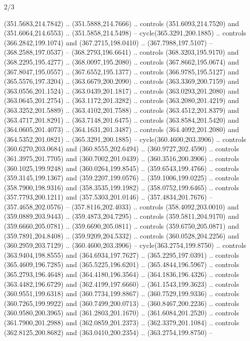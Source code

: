 \begin{flagdescription}{2/3}
\begin{scope}[xshift=0.5\flaglength,yshift=0.5\flagwidth,scale=\flagwidth/495.65]
\begin{scope}[y=0.8pt, x=0.8pt, yscale=-1,shift={(-463.76,-309.78)}]
  (351.5683,214.7842) .. (351.5888,214.7666) .. controls (351.6093,214.7520) and
  (351.6064,214.6553) .. (351.5858,214.5498) -- cycle(365.3291,200.1885) ..
  controls (366.2842,199.1074) and (367.2715,198.0410) .. (367.7988,197.5107) --
  (368.2588,197.0537) -- (368.2793,196.6641) .. controls (368.3203,195.9170) and
  (368.2295,195.4277) .. (368.0097,195.2080) .. controls (367.8662,195.0674) and
  (367.8047,195.0557) .. (367.6552,195.1377) .. controls (366.9785,195.5127) and
  (365.5576,197.3204) .. (363.6679,200.2090) .. controls (363.3369,200.7159) and
  (363.0556,201.1524) .. (363.0439,201.1817) .. controls (363.0293,201.2080) and
  (363.0645,201.2754) .. (363.1172,201.3282) .. controls (363.2080,201.4219) and
  (363.3252,201.5889) .. (363.4102,201.7588) .. controls (363.4512,201.8379) and
  (363.4717,201.8291) .. (363.7148,201.6475) .. controls (363.8584,201.5420) and
  (364.0605,201.4073) .. (364.1631,201.3487) .. controls (364.4092,201.2080) and
  (364.5352,201.0821) .. (365.3291,200.1885) -- cycle(360.4600,203.3906) ..
  controls (360.6270,203.0684) and (360.8555,202.6494) .. (360.9727,202.4590) ..
  controls (361.3975,201.7705) and (360.7002,201.0439) .. (360.3516,200.3906) ..
  controls (360.1025,199.9248) and (360.0264,199.8545) .. (359.6543,199.4766) ..
  controls (359.3145,199.1367) and (359.2207,199.0576) .. (359.1006,199.0225) ..
  controls (358.7900,198.9316) and (358.3535,199.1982) .. (358.0752,199.6465) ..
  controls (357.7793,200.1211) and (357.5303,201.0146) .. (357.4834,201.7676) --
  (357.4658,202.0576) -- (357.8116,202.4033) .. controls (358.4092,203.0010) and
  (359.0889,203.9443) .. (359.4873,204.7295) .. controls (359.5811,204.9170) and
  (359.6660,205.0781) .. (359.6690,205.0811) .. controls (359.6750,205.0871) and
  (359.7891,204.8408) .. (359.9209,204.5332) .. controls (360.0528,204.2256) and
  (360.2959,203.7129) .. (360.4600,203.3906) -- cycle(363.2754,199.8750) ..
  controls (363.9404,198.8555) and (364.6934,197.7627) .. (365.2295,197.0391) ..
  controls (365.4609,196.7285) and (365.5225,196.6201) .. (365.4844,196.5967) ..
  controls (365.2793,196.4648) and (364.4180,196.3564) .. (364.1836,196.4326) ..
  controls (363.4482,196.6729) and (362.4199,197.6660) .. (361.1543,199.3623) ..
  controls (360.9551,199.6318) and (360.7734,199.8867) .. (360.7529,199.9336) ..
  controls (360.7265,199.9922) and (360.7499,200.0713) .. (360.8467,200.2236) ..
  controls (360.9580,200.3965) and (361.2803,201.1670) .. (361.6084,201.2520) ..
  controls (361.7900,201.2988) and (362.0859,201.2373) .. (362.3379,201.1084) ..
  controls (362.8125,200.8682) and (363.0410,200.2354) .. (363.2754,199.8750) --

\end{scope}
\end{scope}
\end{flagdescription}
